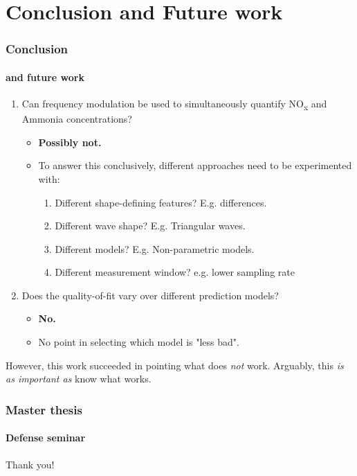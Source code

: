 \documentclass{beamer}
\newcommand{\nox}{\texorpdfstring{NO\textsubscript{x}}{NOx}\xspace}
\begin{document}
\section{Conclusion and Future work}
\begin{frame}
	\frametitle{Conclusion}
	\framesubtitle{and future work}
	
	\begin{enumerate}
		\pause
		\item Can frequency modulation be used to simultaneously quantify \nox and Ammonia concentrations?
		\begin{itemize}
			\pause
			\item \textbf{Possibly not.}
			\pause
			\item To answer this conclusively, different approaches need to be experimented with:
			\begin{enumerate}
				\pause
				\item Different shape-defining features? E.g. differences.
				\pause
				\item Different wave shape? E.g. Triangular waves.
				\pause
				\item Different models? E.g. Non-parametric models.
				\pause
				\item Different measurement window? e.g. lower sampling rate				
				\end{enumerate}
			\end{itemize}
	
		\pause
		\item Does the quality-of-fit vary over different prediction models?
		\begin{itemize}
			\pause
			\item \textbf{No.}
			\pause
			\item No point in selecting which model is "less bad".
		\end{itemize}
	\end{enumerate}

\pause
However, this work succeeded in pointing what does \textit{not} work. Arguably, this \textit{is as important as} know what works.

\end{frame}

\begin{frame}
	\frametitle{Master thesis}
	\framesubtitle{Defense seminar}
	\centering
	\Huge Thank you!
\end{frame}
\end{document}

